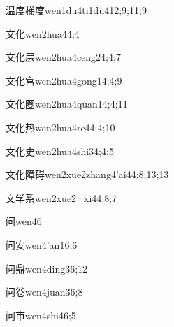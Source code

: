 \begin{verbete}{温度梯度}{wen1du4ti1du4}{12;9;11;9}
\end{verbete}
\begin{verbete}{文化}{wen2hua4}{4;4}
\end{verbete}
\begin{verbete}{文化层}{wen2hua4ceng2}{4;4;7}
\end{verbete}
\begin{verbete}{文化宫}{wen2hua4gong1}{4;4;9}
\end{verbete}
\begin{verbete}{文化圈}{wen2hua4quan1}{4;4;11}
\end{verbete}
\begin{verbete}{文化热}{wen2hua4re4}{4;4;10}
\end{verbete}
\begin{verbete}{文化史}{wen2hua4shi3}{4;4;5}
\end{verbete}
\begin{verbete}{文化障碍}{wen2xue2zhang4'ai4}{4;8;13;13}
\end{verbete}
\begin{verbete}{文学系}{wen2xue2·xi4}{4;8;7}
\end{verbete}
\begin{verbete}{问}{wen4}{6}
\end{verbete}
\begin{verbete}{问安}{wen4'an1}{6;6}
\end{verbete}
\begin{verbete}{问鼎}{wen4ding3}{6;12}
\end{verbete}
\begin{verbete}{问卷}{wen4juan3}{6;8}
\end{verbete}
\begin{verbete}{问市}{wen4shi4}{6;5}
\end{verbete}
